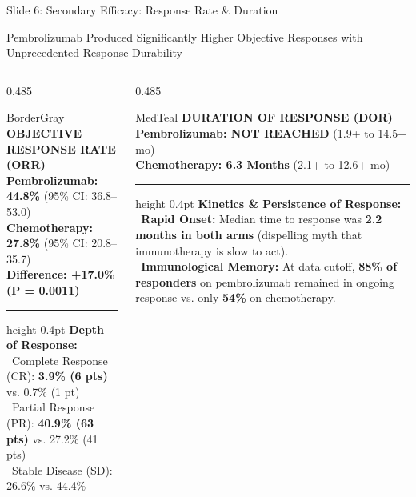\documentclass[aspectratio=169,10pt]{beamer}
\begin{document}
\begin{frame}{Slide 6: Secondary Efficacy: Response Rate \& Duration}
\begin{actionbanner}
Pembrolizumab Produced Significantly Higher Objective Responses with Unprecedented Response Durability
\end{actionbanner}

\vspace{2pt}

\begin{columns}[T]
  \begin{column}{0.485\textwidth}
    \begin{statcard}{BorderGray}
      {\scriptsize\textbf{\color{DeepNavy}OBJECTIVE RESPONSE RATE (ORR)}}\\[2pt]
      \scriptsize
      \textbf{\color{MedTeal}Pembrolizumab: 44.8\%} \tiny(95\% CI: 36.8--53.0)\\
      \textbf{\color{AlertRed}Chemotherapy: 27.8\%} \tiny(95\% CI: 20.8--35.7)\\[2pt]
      \footnotesize\textbf{\color{DeepNavy}Difference: +17.0\%} \quad \scriptsize\textbf{(P = 0.0011)}\\[3pt]
      \hrule height 0.4pt\vskip 3pt
      \tiny
      \textbf{Depth of Response:}\\
      \textbullet\ Complete Response (CR): \textbf{3.9\% (6 pts)} vs. 0.7\% (1 pt)\\
      \textbullet\ Partial Response (PR): \textbf{40.9\% (63 pts)} vs. 27.2\% (41 pts)\\
      \textbullet\ Stable Disease (SD): 26.6\% vs. 44.4\%
    \end{statcard}
  \end{column}

  \begin{column}{0.485\textwidth}
    \begin{statcard}{MedTeal}
      {\scriptsize\textbf{\color{DeepNavy}DURATION OF RESPONSE (DOR)}}\\[2pt]
      \scriptsize
      \textbf{\color{MedTeal}Pembrolizumab: NOT REACHED} \tiny(1.9+ to 14.5+ mo)\\
      \textbf{\color{AlertRed}Chemotherapy: 6.3 Months} \tiny(2.1+ to 12.6+ mo)\\[3pt]
      \hrule height 0.4pt\vskip 3pt
      \tiny
      \textbf{Kinetics \& Persistence of Response:}\\
      \textbullet\ \textbf{Rapid Onset:} Median time to response was \textbf{2.2 months in both arms} (dispelling myth that immunotherapy is slow to act).\\[2pt]
      \textbullet\ \textbf{Immunological Memory:} At data cutoff, \textbf{88\% of responders} on pembrolizumab remained in ongoing response vs. only \textbf{54\%} on chemotherapy.
    \end{statcard}
  \end{column}
\end{columns}
\end{frame}
\end{document}
